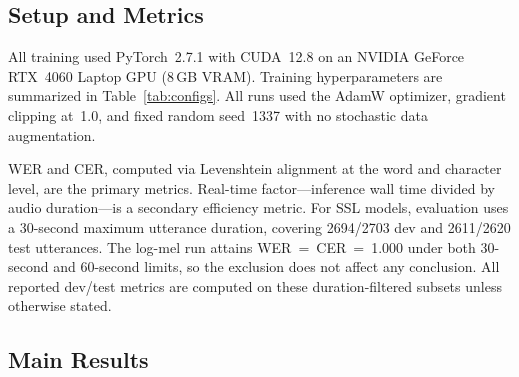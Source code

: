 \documentclass{article}
\begin{document}
\subsection{Setup and Metrics}

All training used PyTorch~2.7.1 with CUDA~12.8 on an NVIDIA GeForce RTX~4060
Laptop GPU (8\,GB VRAM). Training hyperparameters are summarized in
Table~\ref{tab:configs}. All runs used the AdamW optimizer, gradient clipping
at~1.0, and fixed random seed~1337 with no stochastic data augmentation.

\begin{table}[H]
\centering
\caption{Training hyperparameters. FT = two-phase fine-tuning (3 frozen
epochs + 5 fine-tune epochs).}
\label{tab:configs}
\end{table}

WER and CER, computed via Levenshtein alignment at the word and character
level, are the primary metrics. Real-time factor---inference wall time divided
by audio duration---is a secondary efficiency metric. For SSL models, evaluation
uses a 30-second maximum utterance duration, covering 2694/2703 dev and
2611/2620 test utterances. The log-mel run attains WER~=~CER~=~1.000 under both
30-second and 60-second limits, so the exclusion does not affect any conclusion.
All reported dev/test metrics are computed on these duration-filtered subsets
unless otherwise stated.

\subsection{Main Results}
\end{document}
